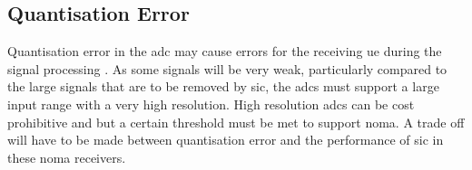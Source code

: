 \subsection{Quantisation Error}
Quantisation error in the \ac{adc} may cause errors for the receiving \ac{ue} during the signal processing \cite{islam:2017}.
As some signals will be very weak, particularly compared to the large signals that are to be removed by \ac{sic}, the \acp{adc} must support a large input range with a very high resolution.
High resolution \acp{adc} can be cost prohibitive and but a certain threshold must be met to support \ac{noma}.
A trade off will have to be made between quantisation error and the performance of \ac{sic} in these \ac{noma} receivers.

